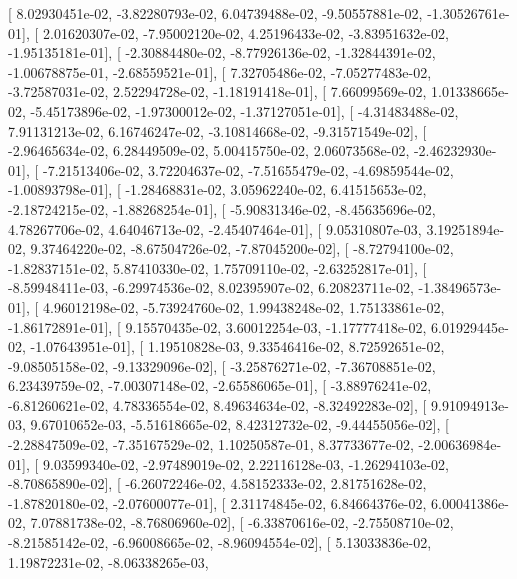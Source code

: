 \documentclass{article}
\begin{document}
       [  8.02930451e-02,  -3.82280793e-02,   6.04739488e-02,
         -9.50557881e-02,  -1.30526761e-01],
       [  2.01620307e-02,  -7.95002120e-02,   4.25196433e-02,
         -3.83951632e-02,  -1.95135181e-01],
       [ -2.30884480e-02,  -8.77926136e-02,  -1.32844391e-02,
         -1.00678875e-01,  -2.68559521e-01],
       [  7.32705486e-02,  -7.05277483e-02,  -3.72587031e-02,
          2.52294728e-02,  -1.18191418e-01],
       [  7.66099569e-02,   1.01338665e-02,  -5.45173896e-02,
         -1.97300012e-02,  -1.37127051e-01],
       [ -4.31483488e-02,   7.91131213e-02,   6.16746247e-02,
         -3.10814668e-02,  -9.31571549e-02],
       [ -2.96465634e-02,   6.28449509e-02,   5.00415750e-02,
          2.06073568e-02,  -2.46232930e-01],
       [ -7.21513406e-02,   3.72204637e-02,  -7.51655479e-02,
         -4.69859544e-02,  -1.00893798e-01],
       [ -1.28468831e-02,   3.05962240e-02,   6.41515653e-02,
         -2.18724215e-02,  -1.88268254e-01],
       [ -5.90831346e-02,  -8.45635696e-02,   4.78267706e-02,
          4.64046713e-02,  -2.45407464e-01],
       [  9.05310807e-03,   3.19251894e-02,   9.37464220e-02,
         -8.67504726e-02,  -7.87045200e-02],
       [ -8.72794100e-02,  -1.82837151e-02,   5.87410330e-02,
          1.75709110e-02,  -2.63252817e-01],
       [ -8.59948411e-03,  -6.29974536e-02,   8.02395907e-02,
          6.20823711e-02,  -1.38496573e-01],
       [  4.96012198e-02,  -5.73924760e-02,   1.99438248e-02,
          1.75133861e-02,  -1.86172891e-01],
       [  9.15570435e-02,   3.60012254e-03,  -1.17777418e-02,
          6.01929445e-02,  -1.07643951e-01],
       [  1.19510828e-03,   9.33546416e-02,   8.72592651e-02,
         -9.08505158e-02,  -9.13329096e-02],
       [ -3.25876271e-02,  -7.36708851e-02,   6.23439759e-02,
         -7.00307148e-02,  -2.65586065e-01],
       [ -3.88976241e-02,  -6.81260621e-02,   4.78336554e-02,
          8.49634634e-02,  -8.32492283e-02],
       [  9.91094913e-03,   9.67010652e-03,  -5.51618665e-02,
          8.42312732e-02,  -9.44455056e-02],
       [ -2.28847509e-02,  -7.35167529e-02,   1.10250587e-01,
          8.37733677e-02,  -2.00636984e-01],
       [  9.03599340e-02,  -2.97489019e-02,   2.22116128e-03,
         -1.26294103e-02,  -8.70865890e-02],
       [ -6.26072246e-02,   4.58152333e-02,   2.81751628e-02,
         -1.87820180e-02,  -2.07600077e-01],
       [  2.31174845e-02,   6.84664376e-02,   6.00041386e-02,
          7.07881738e-02,  -8.76806960e-02],
       [ -6.33870616e-02,  -2.75508710e-02,  -8.21585142e-02,
         -6.96008665e-02,  -8.96094554e-02],
       [  5.13033836e-02,   1.19872231e-02,  -8.06338265e-03,
\end{document}
